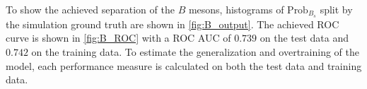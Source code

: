 To show the achieved separation of the $B$ mesons, histograms of $\text{Prob}_{B_s}$ split by the simulation ground truth are shown in \autoref{fig:B_output}.
The achieved ROC curve is shown in \autoref{fig:B_ROC} with a ROC AUC of $0.739$ on the test data and $0.742$ on the training data.
To estimate the generalization and overtraining of the model, each performance measure is calculated on both the test data and training data.